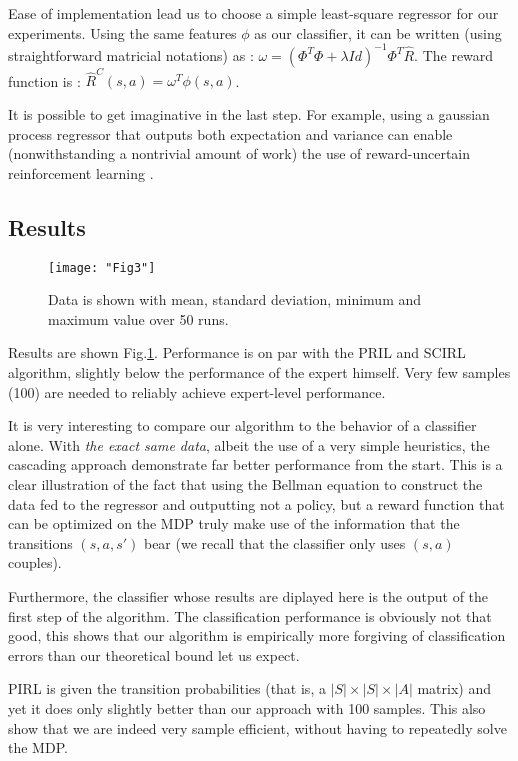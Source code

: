 \documentclass[smallextended]{svjour3}
\begin{document}
Ease of implementation lead us to choose a simple least-square regressor for our experiments. Using the same features $\phi$ as our classifier, it can be written (using straightforward matricial notations) as :  $\omega = (\Phi^T\Phi + \lambda Id)^{-1}\Phi^T\hat R$. The reward function is : $\hat R^C(s,a) = \omega^T \phi(s,a)$.

It is possible to get imaginative in the last step. For example, using a gaussian process regressor \cite{rasmussen2006gaussian} that outputs both expectation and variance can enable (nonwithstanding a nontrivial amount of work) the use of reward-uncertain reinforcement learning \cite{regan2011robust}. 

\subsection{Results}
\label{subsec:results}
\begin{figure}
  \texttt{[image: "Fig3"]}
  \caption{Data is shown with mean, standard deviation, minimum and maximum value over 50 runs.}
  \label{fig:Highway}
\end{figure}

Results are shown Fig.\ref{fig:Highway}. Performance is on par with the PRIL and SCIRL algorithm, slightly below the performance of the expert himself. Very few samples (100) are needed to reliably achieve expert-level performance.

It is very interesting to compare our algorithm to the behavior of a classifier alone. With \emph{the exact same data}, albeit the use of a very simple heuristics, the cascading approach demonstrate far better performance from the start. This is a clear illustration of the fact that using the Bellman equation to construct the data fed to the regressor and outputting not a policy, but a reward function that can be optimized on the MDP truly make use of the information that the transitions $(s,a,s')$ bear (we recall that the classifier only uses $(s,a)$ couples).

Furthermore, the classifier whose results are diplayed here is the output of the first step of the algorithm. The classification performance is obviously not that good, this shows that our algorithm is empirically more forgiving of classification errors than our theoretical bound let us expect.

PIRL is given the transition probabilities (that is, a $|S|\times |S|\times |A|$ matrix) and yet it does only slightly better than our approach with 100 samples. This also show that we are indeed very sample efficient, without having to repeatedly solve the MDP.
\end{document}
